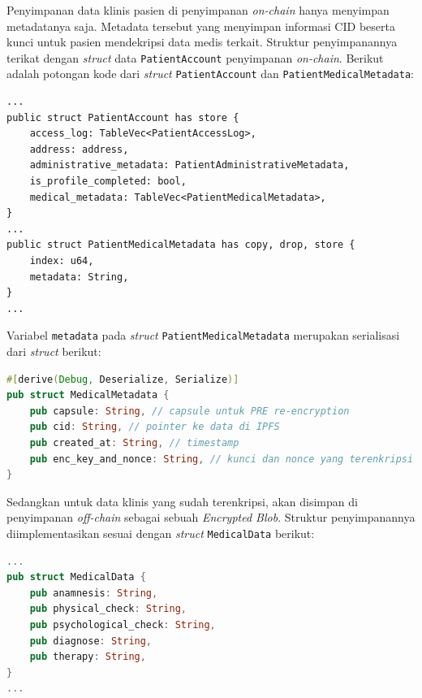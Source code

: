 Penyimpanan data klinis pasien di penyimpanan \textit{on-chain} hanya menyimpan metadatanya saja. Metadata tersebut yang menyimpan informasi CID beserta kunci untuk pasien mendekripsi data medis terkait. Struktur penyimpanannya terikat dengan \textit{struct} data \texttt{PatientAccount} penyimpanan \textit{on-chain}. Berikut adalah potongan kode dari \textit{struct} \texttt{PatientAccount} dan \texttt{PatientMedicalMetadata}:

\begin{lstlisting}[language=Move]
...
public struct PatientAccount has store {
    access_log: TableVec<PatientAccessLog>,
    address: address,
    administrative_metadata: PatientAdministrativeMetadata,
    is_profile_completed: bool,
    medical_metadata: TableVec<PatientMedicalMetadata>,
}
...
public struct PatientMedicalMetadata has copy, drop, store {
    index: u64,
    metadata: String,
}
...
\end{lstlisting}

Variabel \texttt{metadata} pada \textit{struct} \texttt{PatientMedicalMetadata} merupakan serialisasi dari \textit{struct} berikut:

\begin{lstlisting}[language=Rust]
#[derive(Debug, Deserialize, Serialize)]
pub struct MedicalMetadata {
    pub capsule: String, // capsule untuk PRE re-encryption
    pub cid: String, // pointer ke data di IPFS
    pub created_at: String, // timestamp
    pub enc_key_and_nonce: String, // kunci dan nonce yang terenkripsi
}
\end{lstlisting}

Sedangkan untuk data klinis yang sudah terenkripsi, akan disimpan di penyimpanan \textit{off-chain} sebagai sebuah \textit{Encrypted Blob}. Struktur penyimpanannya diimplementasikan sesuai dengan \textit{struct} \texttt{MedicalData} berikut:

\begin{lstlisting}[language=Rust]
...
pub struct MedicalData {
    pub anamnesis: String,
    pub physical_check: String,
    pub psychological_check: String,
    pub diagnose: String,
    pub therapy: String,
}
...
\end{lstlisting}

